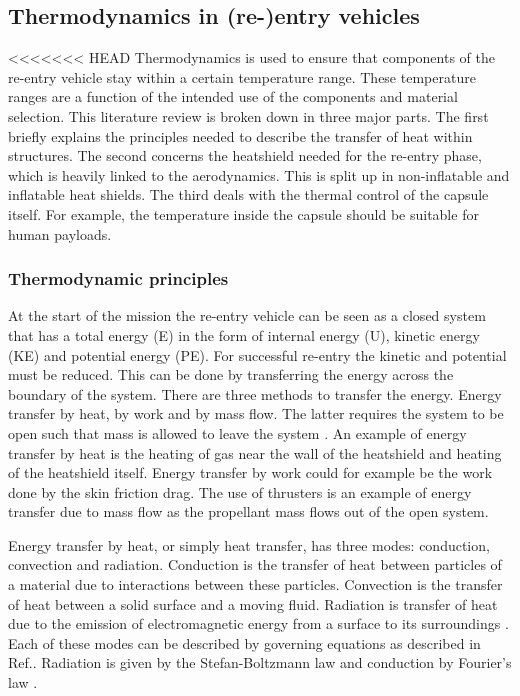 \subsection{Thermodynamics in (re-)entry vehicles}\label{sec:thermo}
<<<<<<< HEAD
Thermodynamics is used to ensure that components of the re-entry vehicle stay within a certain temperature range. These temperature ranges are a function of the intended use of the components and material selection. This literature review is broken down in three major parts. The first briefly explains the principles needed to describe the transfer of heat within structures. The second concerns the heatshield needed for the re-entry phase, which is heavily linked to the aerodynamics. This is split up in non-inflatable and inflatable heat shields. The third deals with the thermal control of the capsule itself. For example, the temperature inside the capsule should be suitable for human payloads.

\subsubsection{Thermodynamic principles}
At the start of the mission the re-entry vehicle can be seen as a closed system that has a total energy (E) in the form of internal energy (U), kinetic energy (KE) and potential energy (PE). For successful re-entry the kinetic and potential must be reduced. This can be done by transferring the energy across the boundary of the system. There are three methods to transfer the energy. Energy transfer by heat, by work and by mass flow. The latter requires the system to be open such that mass is allowed to leave the system \cite{Cengel2010}. An example of energy transfer by heat is the heating of gas near the wall of the heatshield and heating of the heatshield itself. Energy transfer by work could for example be the work done by the skin friction drag. The use of thrusters is an example of energy transfer due to mass flow as the propellant mass flows out of the open system. 

Energy transfer by heat, or simply heat transfer, has three modes: conduction, convection and radiation. Conduction is the transfer of heat between particles of a material due to interactions between these particles. Convection is the transfer of heat between a solid surface and a moving fluid. Radiation is transfer of heat due to the emission of electromagnetic energy from a surface to its surroundings \cite{Cengel2010, Karam1998}. Each of these modes can be described by governing equations as described in Ref.\cite{Holman2002}. Radiation is given by the Stefan-Boltzmann law and conduction by Fourier's law \cite{Cengel2010, Holman2002}.

